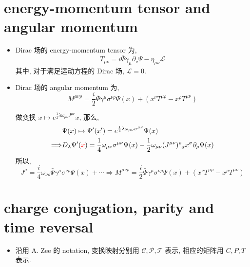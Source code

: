 \section{energy-momentum tensor and angular momentum}
\begin{itemize}
	\item Dirac 场的 energy-momentum tensor 为,
	\begin{equation} \label{7.4.1}
		T_{\mu \nu} = i \bar{\Psi} \gamma_\mu \partial_\nu \Psi - \eta_{\mu \nu} \mathcal{L}
	\end{equation}
	其中, 对于满足运动方程的 Dirac 场, $\mathcal{L} = 0$.
	
	\item  Dirac 场的 angular momentum 为,
	\begin{equation} \label{7.4.2}
		M^{\mu \nu \rho} = \frac{i}{2} \bar{\Psi} \gamma^\mu \sigma^{\nu \rho} \Psi(x) + (x^\nu T^{\mu \rho} - x^\rho T^{\mu \nu})
	\end{equation}
	
	\begin{tcolorbox}[title=calculation:]
		做变换 $x \mapsto e^{\frac{1}{2} \lambda \omega_{\mu \nu} J^{\mu \nu}} x$, 那么,
		\begin{align}
			& \Psi(x) \mapsto \Psi'(x') = e^{\frac{1}{4} \lambda \omega_{\mu \nu} \sigma^{\mu \nu}} \Psi(x) \notag \\
			\Longrightarrow & D_\lambda \Psi'(\mathcolor{red}{x}) = \frac{1}{4} \omega_{\mu \nu} \sigma^{\mu \nu} \Psi(x) - \frac{1}{2} \omega_{\mu \nu} \tensor{(J^{\mu \nu})}{^\rho_\sigma} x^\sigma \partial_\rho \Psi(x)
		\end{align}
		所以,
		\begin{equation}
			J^\mu = \frac{i}{4} \omega_{\nu \rho} \bar{\Psi} \gamma^\mu \sigma^{\nu \rho} \Psi(x) + \cdots \Longrightarrow M^{\mu \nu \rho} = \frac{i}{2} \bar{\Psi} \gamma^\mu \sigma^{\nu \rho} \Psi(x) + (x^\nu T^{\mu \rho} - x^\rho T^{\mu \nu})
		\end{equation}
	\end{tcolorbox}
\end{itemize}

\section{charge conjugation, parity and time reversal}
\begin{itemize}
	\item 沿用 A. Zee 的 notation, 变换映射分别用 $\mathcal{C}, \mathcal{P}, \mathcal{T}$ 表示, 相应的矩阵用 $C, P, T$ 表示.
\end{itemize}

